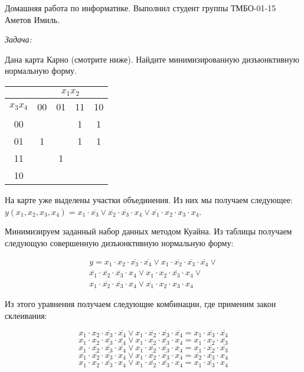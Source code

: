 \documentclass[a4paper, 12pt]{article}
\begin{document}
Домашняя работа по информатике. Выполнил студент группы ТМБО-01-15 Аметов Имиль.

\emph{Задача:}

Дана карта Карно (смотрите ниже). Найдите минимизированную дизъюнктивную нормальную форму.

\begin{tabular}{ccccc}
  \multicolumn{1}{c|}{} & \multicolumn{4}{c|}{$x_1x_2$} \\ \hline
  \multicolumn{1}{c|}{$x_3x_4$} & 00 & 01 & 11 & \multicolumn{1}{c|}{10} \\ \hline
  \multicolumn{1}{c|}{00} & && \multicolumn{1}{|c}{1} & \multicolumn{1}{c|}{1} \\ \cline{5-5} \cline{2-2}
  \multicolumn{1}{c|}{01} & \multicolumn{1}{|c|}{1} && \multicolumn{1}{|c}{1} &\multicolumn{1}{|c|}{1} \\ \cline{2-5} 
  \multicolumn{1}{c|}{11} && \multicolumn{1}{|c|}{1} & & \multicolumn{1}{c|}{}\\ \cline{3-3}
  \multicolumn{1}{c|}{10} &&&& \multicolumn{1}{c|}{}\\ \hline
\end{tabular}

На карте уже выделены участки объединения. Из них мы получаем следующее: $y(x_1, x_2, x_3, x_4) = x_1 \cdot \overline{x_3} \vee \overline{x_2} \cdot \overline{x_3} \cdot x_4 \vee \overline{x_1} \cdot x_2 \cdot x_3 \cdot x_4$.

Минимизируем заданный набор данных методом Куайна. Из таблицы получаем следующую совершенную дизъюнктивную нормальную форму:

\begin{eqnarray}\label{start_equation}
  y = x_1 \cdot x_2 \cdot \overline{x_3} \cdot \overline{x_4} \vee x_1 \cdot \overline{x_2} \cdot \overline{x_3} \cdot \overline{x_4} \vee \nonumber \\
  \overline{x_1} \cdot \overline{x_2} \cdot  \overline{x_3} \cdot x_4 \vee x_1 \cdot x_2 \cdot \overline{x_3} \cdot x_4 \vee \nonumber \\
  x_1 \cdot \overline{x_2} \cdot \overline{x_3} \cdot x_4 \vee \overline{x_1} \cdot x_2 \cdot x_3 \cdot x_4
\end{eqnarray}

Из этого уравнения получаем следующие комбинации, где применим закон склеивания:

$$x_1 \cdot x_2 \cdot \overline{x_3} \cdot \overline{x_4} \vee x_1 \cdot \overline{x_2} \cdot \overline{x_3} \cdot \overline{x_4} = x_1 \cdot \overline{x_3} \cdot \overline{x_4}$$
$$x_1 \cdot x_2 \cdot \overline{x_3} \cdot \overline{x_4} \vee x_1 \cdot x_2 \cdot \overline{x_3} \cdot x_4 = x_1 \cdot x_2 \cdot \overline{x_3}$$
$$x_1 \cdot \overline{x_2} \cdot \overline{x_3} \cdot \overline{x_4} \vee x_1 \cdot \overline{x_2} \cdot \overline{x_3} \cdot x_4 = x_1 \cdot \overline{x_2} \cdot \overline{x_3}$$
$$\overline{x_1} \cdot \overline{x_2} \cdot \overline{x_3} \cdot x_4 \vee x_1 \cdot \overline{x_2} \cdot \overline{x_3} \cdot x_4 = \overline{x_2} \cdot \overline{x_3} \cdot x_4$$
$$x_1 \cdot x_2 \cdot \overline{x_3} \cdot x_4 \vee x_1 \cdot \overline{x_2} \cdot \overline{x_3} \cdot x_4 = x_1 \cdot \overline{x_3} \cdot x_4$$
\end{document}
